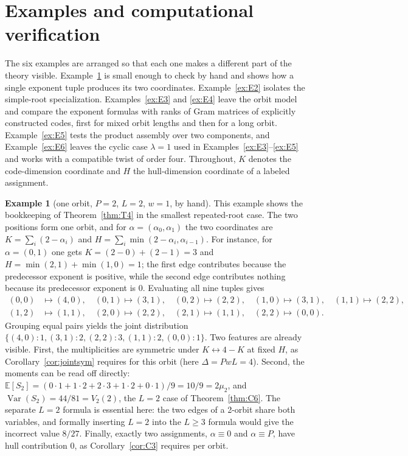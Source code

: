 \documentclass[10pt,journal,draftclsnofoot,onecolumn]{IEEEtran}
\theoremstyle{definition}
\newtheorem{example}[theorem]{Example}
\theoremstyle{remark}
\newcommand{\E}{\mathbb{E}}
\begin{document}
\section{Examples and computational verification}\label{sec:examples}

The six examples are arranged so that each one makes a different part
of the theory visible. Example~\ref{ex:E1} is small enough to check by
hand and shows how a single exponent tuple produces its two coordinates.
Example~\ref{ex:E2} isolates the simple-root specialization.
Examples~\ref{ex:E3} and \ref{ex:E4} leave the orbit model and compare
the exponent formulas with ranks of Gram matrices of explicitly
constructed codes, first for mixed orbit lengths and then for a long
orbit. Example~\ref{ex:E5} tests the product assembly over two
components, and Example~\ref{ex:E6} leaves the cyclic case \(\lambda = 1\)
used in Examples~\ref{ex:E3}--\ref{ex:E5} and works with a compatible
twist of order four. Throughout, \(K\) denotes the code-dimension coordinate and
\(H\) the hull-dimension coordinate of a labeled assignment.

\begin{example}[one orbit, \(P=2\), \(L=2\), \(w=1\), by hand]
\label{ex:E1}
This example shows the bookkeeping of Theorem~\ref{thm:T4} in the
smallest repeated-root case. The two positions form one orbit, and for
\(\alpha = (\alpha_0,\alpha_1)\) the two coordinates are
\(K = \sum_i (2-\alpha_i)\) and
\(H = \sum_i \min(2-\alpha_i, \alpha_{i-1})\). For instance, for
\(\alpha = (0,1)\) one gets \(K = (2-0) + (2-1) = 3\) and
\(H = \min(2,1) + \min(1,0) = 1\); the first edge contributes because
the predecessor exponent is positive, while the second edge contributes
nothing because its predecessor exponent is \(0\). Evaluating all nine
tuples gives
\[
\begin{aligned}
(0,0)&\mapsto(4,0),\quad (0,1)\mapsto(3,1),\quad (0,2)\mapsto(2,2),\quad
(1,0)\mapsto(3,1),\quad (1,1)\mapsto(2,2),\\
(1,2)&\mapsto(1,1),\quad (2,0)\mapsto(2,2),\quad (2,1)\mapsto(1,1),\quad (2,2)\mapsto(0,0).
\end{aligned}
\]
Grouping equal pairs yields the joint distribution
\(\{(4,0):1, (3,1):2, (2,2):3, (1,1):2, (0,0):1\}\). Two features are
already visible. First, the multiplicities are symmetric under
\(K \leftrightarrow 4-K\) at fixed \(H\), as
Corollary~\ref{cor:jointsym} requires for this orbit (here
\(\Delta = PwL = 4\)). Second, the moments can be read off directly:
\(\E[S_2] = (0\cdot1 + 1\cdot2 + 2\cdot3 + 1\cdot2 + 0\cdot1)/9 =
10/9 = 2\mu_2\), and
\(\operatorname{Var}(S_2) = 44/81 = V_2(2)\), the \(L=2\) case of
Theorem~\ref{thm:C6}. The separate \(L=2\) formula is essential here:
the two edges of a 2-orbit share both variables, and formally inserting
\(L=2\) into the \(L \ge 3\) formula would give the incorrect value
\(8/27\). Finally, exactly two assignments, \(\alpha \equiv 0\) and
\(\alpha \equiv P\), have hull contribution \(0\), as
Corollary~\ref{cor:C3} requires per orbit.
\end{example}
\end{document}
